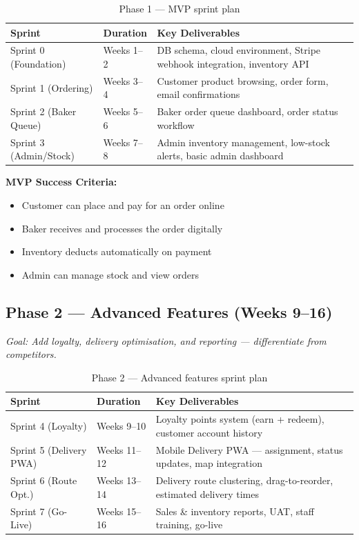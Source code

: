 \documentclass[12pt, a4paper]{report}
\begin{document}
\begin{table}[H]
  \centering
  \begin{tabularx}{\textwidth}{L{4cm} L{2.5cm} X}
    \toprule
    \textbf{Sprint} & \textbf{Duration} & \textbf{Key Deliverables} \\
    \midrule
    Sprint 0 (Foundation)    & Weeks 1--2 & DB schema, cloud environment, Stripe webhook integration, inventory API \\
    Sprint 1 (Ordering)      & Weeks 3--4 & Customer product browsing, order form, email confirmations \\
    Sprint 2 (Baker Queue)   & Weeks 5--6 & Baker order queue dashboard, order status workflow \\
    Sprint 3 (Admin/Stock)   & Weeks 7--8 & Admin inventory management, low-stock alerts, basic admin dashboard \\
    \bottomrule
  \end{tabularx}
  \caption{Phase 1 --- MVP sprint plan}
\end{table}

\textbf{MVP Success Criteria:}
\begin{itemize}[noitemsep]
  \item Customer can place and pay for an order online \checkmark
  \item Baker receives and processes the order digitally \checkmark
  \item Inventory deducts automatically on payment \checkmark
  \item Admin can manage stock and view orders \checkmark
\end{itemize}

\subsection{Phase 2 --- Advanced Features (Weeks 9--16)}

\textit{Goal: Add loyalty, delivery optimisation, and reporting --- differentiate
from competitors.}

\begin{table}[H]
  \centering
  \begin{tabularx}{\textwidth}{L{4cm} L{2.5cm} X}
    \toprule
    \textbf{Sprint} & \textbf{Duration} & \textbf{Key Deliverables} \\
    \midrule
    Sprint 4 (Loyalty)       & Weeks 9--10  & Loyalty points system (earn + redeem), customer account history \\
    Sprint 5 (Delivery PWA)  & Weeks 11--12 & Mobile Delivery PWA --- assignment, status updates, map integration \\
    Sprint 6 (Route Opt.)    & Weeks 13--14 & Delivery route clustering, drag-to-reorder, estimated delivery times \\
    Sprint 7 (Go-Live)       & Weeks 15--16 & Sales \& inventory reports, UAT, staff training, go-live \\
    \bottomrule
  \end{tabularx}
  \caption{Phase 2 --- Advanced features sprint plan}
\end{table}
\end{document}
